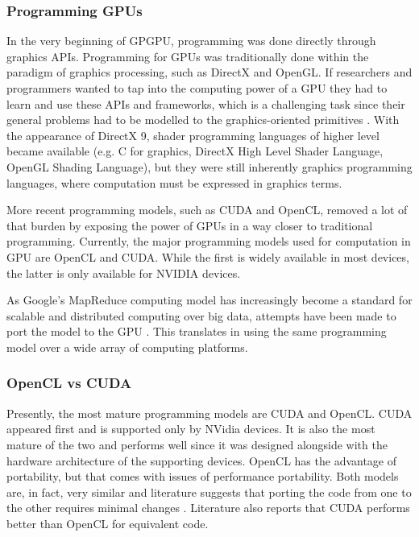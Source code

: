 \subsubsection{Programming GPUs}

In the very beginning of GPGPU, programming was done directly through graphics APIs.
Programming for GPUs was traditionally done within the paradigm of graphics processing, such as DirectX and OpenGL.
If researchers and programmers wanted to tap into the computing power of a GPU they had to learn and use these APIs and frameworks, which is a challenging task since their general problems had to be modelled to the graphics-oriented primitives \cite{Misi2012}.
With the appearance of DirectX 9, shader programming languages of higher level became available (e.g. C for graphics, DirectX High Level Shader Language, OpenGL Shading Language), but they were still inherently graphics programming languages, where computation must be expressed in graphics terms. 

More recent programming models, such as CUDA and OpenCL, removed a lot of that burden by exposing the power of GPUs in a way closer to traditional programming.
Currently, the major programming models used for computation in GPU are OpenCL and CUDA.
While the first is widely available in most devices, the latter is only available for NVIDIA devices.

As Google's MapReduce computing model has increasingly become a standard for scalable and distributed computing over big data, attempts have been made to port the model to the GPU \cite{Ji2011,Xin2012,He2008}.
This translates in using the same programming model over a wide array of computing platforms.


\subsubsection{OpenCL vs CUDA}

Presently, the most mature programming models are CUDA and OpenCL.
CUDA appeared first and is supported only by NVidia devices.
It is also the most mature of the two and performs well since it was designed alongside with the hardware architecture of the supporting devices.
OpenCL has the advantage of portability, but that comes with issues of performance portability.
Both models are, in fact, very similar and literature suggests that porting the code from one to the other requires minimal changes \cite{Karimi2010,Su2012}.
Literature also reports that CUDA performs better than OpenCL \cite{Su2012} for equivalent code.

